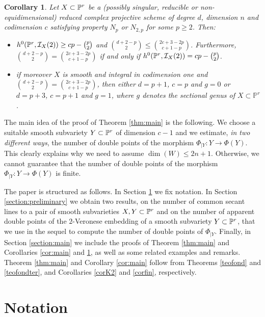 \documentclass{amsart}
\newtheorem{corollary}{Corollary}
\theoremstyle{definition}
\begin{document}
\begin{corollary}\label{cor:Np}
Let $X\subset\Bbb{P}^{r}$ be a (possibly singular, reducible or
non-equidimensional) reduced complex projective scheme of degree
$d$, dimension $n$ and codimension $c$ satisfying property $N_{p}$
or $N_{2,p}$ for some $p\geq 2$. Then:
\begin{itemize}
\item[(i)] $h^0(\Bbb{P}^{r},\mathcal{I}_X(2))\geq cp-\binom{p}{2}$ and
$\binom{d+2-p}{2}\leq \binom{2c+3-2p}{c+1-p}$. Furthermore,
$\binom{d+2-p}{2}=\binom{2c+3-2p}{c+1-p}$ if and only if
$h^0(\Bbb{P}^{r},\mathcal{I}_X(2))=cp-\binom{p}{2}$.
\item[(ii)] if moreover $X$ is smooth and integral in codimension one and $\binom{d+2-p}{2}=\binom{2c+3-2p}{c+1-p}$, then
either $d=p+1$, $c=p$ and $g=0$ or $d=p+3$, $c=p+1$ and $g=1$, where
$g$ denotes the sectional genus of $X\subset{{\mathbb P}}^r$.
\end{itemize}
\end{corollary}

The main idea of the proof of Theorem \ref{thm:main} is the
following. We choose a suitable smooth subvariety
$Y\subset\Bbb{P}^{r}$ of dimension $c-1$ and we estimate, \emph{in
two different ways}, the number of double points of the morphism
$\Phi_{|Y}:Y\to\Phi(Y)$. This clearly explains why we need to assume
$\dim(W)\leq 2n+1$. Otherwise, we cannot guarantee that the number
of double points of the morphism $\Phi_{|Y}:Y\to\Phi(Y)$ is finite.

The paper is structured as follows. In Section
\ref{section:notation} we fix notation. In Section
\ref{section:preliminary} we obtain two results, on the number of
common secant lines to a pair of smooth subvarieties
$X,Y\subset\Bbb{P}^{r}$ and on the number of apparent double points
of the $2$-Veronese embedding of a smooth subvariety
$Y\subset\Bbb{P}^{r}$, that we use in the sequel to compute the
number of double points of $\Phi_{|Y}$. Finally, in Section
\ref{section:main} we include the proofs of Theorem \ref{thm:main}
and Corollaries \ref{cor:main} and \ref{cor:Np}, as well as some
related examples and remarks. Theorem \ref{thm:main} and Corollary
\ref{cor:main} follow from Theorems \ref{teofond} and
\ref{teofondter}, and Corollaries \ref{corK2} and \ref{corfin},
respectively.

\section{Notation}\label{section:notation}
\end{document}
